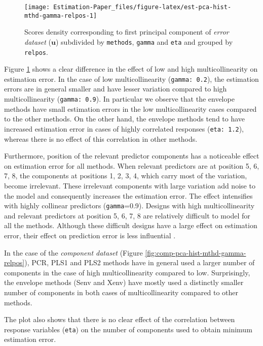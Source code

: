\documentclass[12pt,3p,authoryear]{elsarticle}
\begin{document}
\begin{figure}[!htb]
\texttt{[image: Estimation-Paper\_files/figure-latex/est-pca-hist-mthd-gamma-relpos-1]} \caption{Scores density corresponding to first principal component of \emph{error dataset} (\(\mathbf{u}\)) subdivided by \texttt{methods}, \texttt{gamma} and \texttt{eta} and grouped by \texttt{relpos}.}\label{fig:est-pca-hist-mthd-gamma-relpos}
\end{figure}

Figure \ref{fig:est-pca-hist-mthd-gamma-relpos} shows a clear difference in the effect of low and high multicollinearity on estimation error. In the case of low multicollinearity (\texttt{gamma:\ 0.2}), the estimation errors are in general smaller and have lesser variation compared to high multicollinearity (\texttt{gamma:\ 0.9}). In particular we observe that the envelope methods have small estimation errors in the low multicollinearity cases compared to the other methods. On the other hand, the envelope methods tend to have increased estimation error in cases of highly correlated responses (\texttt{eta:\ 1.2}), whereas there is no effect of this correlation in other methods.

Furthermore, position of the relevant predictor components has a noticeable effect on estimation error for all methods. When relevant predictors are at position 5, 6, 7, 8, the components at positions 1, 2, 3, 4, which carry most of the variation, become irrelevant. These irrelevant components with large variation add noise to the model and consequently increases the estimation error. The effect intensifies with highly collinear predictors (\texttt{gamma}=0.9). Designs with high multicollinearity and relevant predictors at position 5, 6, 7, 8 are relatively difficult to model for all the methods. Although these difficult designs have a large effect on estimation error, their effect on prediction error is less influential \citep{rimal2019pred}.



In the case of the \emph{component dataset} (Figure \ref{fig:comp-pca-hist-mthd-gamma-relpos}), PCR, PLS1 and PLS2 methods have in general used a larger number of components in the case of high multicollinearity compared to low. Surprisingly, the envelope methods (Senv and Xenv) have mostly used a distinctly smaller number of components in both cases of multicollinearity compared to other methods.

The plot also shows that there is no clear effect of the correlation between response variables (\texttt{eta}) on the number of components used to obtain minimum estimation error.
\end{document}
